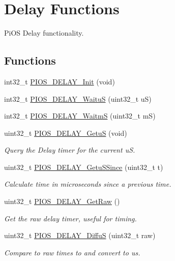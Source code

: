 \hypertarget{group___p_i_o_s___d_e_l_a_y}{\section{\-Delay \-Functions}
\label{group___p_i_o_s___d_e_l_a_y}
}


\-Pi\-O\-S \-Delay functionality.  


\subsection*{\-Functions}
\begin{DoxyCompactItemize}
\item 
int32\-\_\-t \hyperlink{group___p_i_o_s___d_e_l_a_y_ga0d086bac039cb8236edb457b7d4da0fa}{\-P\-I\-O\-S\-\_\-\-D\-E\-L\-A\-Y\-\_\-\-Init} (void)
\item 
int32\-\_\-t \hyperlink{group___p_i_o_s___d_e_l_a_y_ga70d41fcf58bbbd18a9b6cd365d0f2dab}{\-P\-I\-O\-S\-\_\-\-D\-E\-L\-A\-Y\-\_\-\-Waitu\-S} (uint32\-\_\-t u\-S)
\item 
int32\-\_\-t \hyperlink{group___p_i_o_s___d_e_l_a_y_gacde17b263c115e410008da1357dd4ff8}{\-P\-I\-O\-S\-\_\-\-D\-E\-L\-A\-Y\-\_\-\-Waitm\-S} (uint32\-\_\-t m\-S)
\item 
uint32\-\_\-t \hyperlink{group___p_i_o_s___d_e_l_a_y_ga2bf95c0ee53ebb01adb2a57c0c25a061}{\-P\-I\-O\-S\-\_\-\-D\-E\-L\-A\-Y\-\_\-\-Getu\-S} (void)
\begin{DoxyCompactList}\small\item\em \-Query the \-Delay timer for the current u\-S. \end{DoxyCompactList}\item 
uint32\-\_\-t \hyperlink{group___p_i_o_s___d_e_l_a_y_gaf474339ea05285a6a4fe90ff4328893b}{\-P\-I\-O\-S\-\_\-\-D\-E\-L\-A\-Y\-\_\-\-Getu\-S\-Since} (uint32\-\_\-t t)
\begin{DoxyCompactList}\small\item\em \-Calculate time in microseconds since a previous time. \end{DoxyCompactList}\item 
uint32\-\_\-t \hyperlink{group___p_i_o_s___d_e_l_a_y_gafcf436aa29b4693c87e33843959edd80}{\-P\-I\-O\-S\-\_\-\-D\-E\-L\-A\-Y\-\_\-\-Get\-Raw} ()
\begin{DoxyCompactList}\small\item\em \-Get the raw delay timer, useful for timing. \end{DoxyCompactList}\item 
uint32\-\_\-t \hyperlink{group___p_i_o_s___d_e_l_a_y_gad0eb20f09635f32f75dcb6c5430b8764}{\-P\-I\-O\-S\-\_\-\-D\-E\-L\-A\-Y\-\_\-\-Diffu\-S} (uint32\-\_\-t raw)
\begin{DoxyCompactList}\small\item\em \-Compare to raw times to and convert to us. \end{DoxyCompactList}\end{DoxyCompactItemize}


